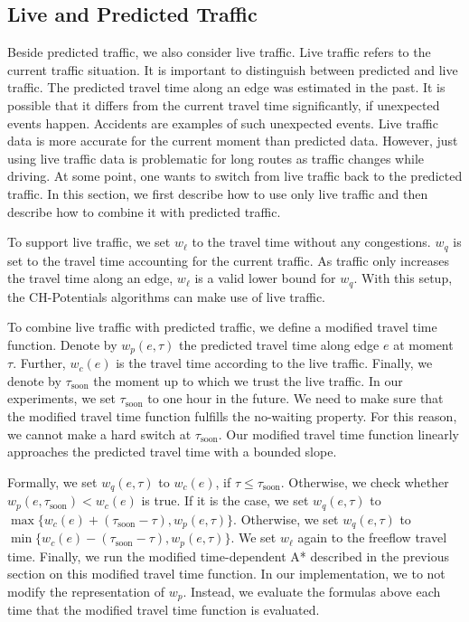 \documentclass[letterpaper]{article} %
\begin{document}
\subsection{Live and Predicted Traffic}
\label{sec:live-predicted-traffic}

Beside predicted traffic, we also consider live traffic.
Live traffic refers to the current traffic situation.
It is important to distinguish between predicted and live traffic.
The predicted travel time along an edge was estimated in the past.
It is possible that it differs from the current travel time significantly, if unexpected events happen.
Accidents are examples of such unexpected events.
Live traffic data is more accurate for the current moment than predicted data.
However, just using live traffic data is problematic for long routes as traffic changes while driving.
At some point, one wants to switch from live traffic back to the predicted traffic.
In this section, we first describe how to use only live traffic and then describe how to combine it with predicted traffic.

To support live traffic, we set $w_\ell$ to the travel time without any congestions.
$w_q$ is set to the travel time accounting for the current traffic.
As traffic only increases the travel time along an edge, $w_\ell$ is a valid lower bound for $w_q$.
With this setup, the CH-Potentials algorithms can make use of live traffic.

To combine live traffic with predicted traffic, we define a modified travel time function.
Denote by $w_p(e,\tau)$ the predicted travel time along edge $e$ at moment $\tau$.
Further, $w_c(e)$ is the travel time according to the live traffic.
Finally, we denote by $\tau_{\mathrm{soon}}$ the moment up to which we trust the live traffic.
In our experiments, we set $\tau_{\mathrm{soon}}$ to one hour in the future.
We need to make sure that the modified travel time function fulfills the no-waiting property.
For this reason, we cannot make a hard switch at $\tau_{\mathrm{soon}}$.
Our modified travel time function linearly approaches the predicted travel time with a bounded slope.

Formally, we set $w_q(e,\tau)$ to $w_c(e)$, if $\tau \leq \tau_{\mathrm{soon}}$.
Otherwise, we check whether $w_p(e,\tau_{\mathrm{soon}}) < w_c(e)$ is true.
If it is the case, we set $w_q(e,\tau)$ to $\max\{w_c(e)+(\tau_{\mathrm{soon}}-\tau), w_p(e,\tau)\}$.
Otherwise, we set $w_q(e,\tau)$ to $\min\{w_c(e)-(\tau_{\mathrm{soon}}-\tau), w_p(e,\tau)\}$.
We set $w_\ell$ again to the freeflow travel time.
Finally, we run the modified time-dependent A* described in the previous section on this modified travel time function.
In our implementation, we to not modify the representation of $w_p$.
Instead, we evaluate the formulas above each time that the modified travel time function is evaluated.
\end{document}
